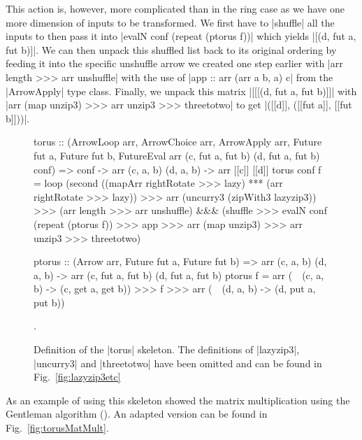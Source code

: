 This action is, however,  more complicated than in the ring case as we have one more dimension of inputs to be transformed. We first have to |shuffle| all the inputs to then pass it into |evalN conf (repeat (ptorus f))| which yields |[(d, fut a, fut b)]|. We can then unpack this shuffled list back to its original ordering by feeding it into the specific unshuffle arrow we created one step earlier with |arr length >>> arr unshuffle| with the use of |app :: arr (arr a b, a) c| from the |ArrowApply| type class. Finally, we unpack this matrix |[[[(d, fut a, fut b)]]| with |arr (map unzip3) >>> arr unzip3 >>> threetotwo| to get  |([[d]], ([[fut a]], [[fut b]]))|.

\begin{figure}[tb]
\begin{code}
torus :: (ArrowLoop arr, ArrowChoice arr, ArrowApply arr, Future fut a, Future fut b,
          FutureEval arr (c, fut a, fut b) (d, fut a, fut b) conf) =>
	conf -> arr (c, a, b) (d, a, b) -> arr [[c]] [[d]]
torus conf f =
	loop (second ((mapArr rightRotate >>> lazy) *** (arr rightRotate >>> lazy)) >>>
	arr (uncurry3 (zipWith3 lazyzip3)) >>>
	(arr length >>> arr unshuffle) &&& (shuffle >>> evalN conf (repeat (ptorus f)) >>> app >>>
	arr (map unzip3) >>> arr unzip3 >>> threetotwo)

ptorus :: (Arrow arr, Future fut a, Future fut b) =>
	arr (c, a, b) (d, a, b) -> arr (c, fut a, fut b) (d, fut a, fut b)
ptorus f = arr (\ ~(c, a, b) -> (c, get a, get b)) >>> f >>> arr (\ ~(d, a, b) -> (d, put a, put b))
\end{code} %
\caption{Definition of the |torus| skeleton. The definitions of |lazyzip3|, |uncurry3| and |threetotwo| have been omitted and can be found in Fig.~\ref{fig:lazyzip3etc}}.
\label{fig:torus}
\end{figure}
As an example of using this skeleton \citep{Eden:SkeletonBookChapter02} showed the matrix multiplication using the Gentleman algorithm (\citeyear{Gentleman1978}). An adapted version can be found in Fig.~\ref{fig:torusMatMult}.
